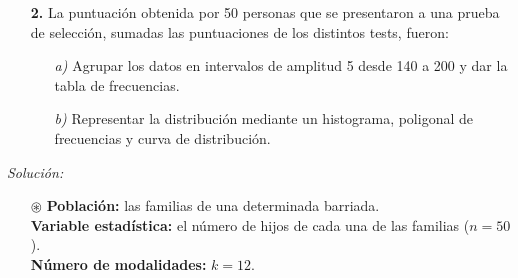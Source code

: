 \documentclass[11pt,a4paper]{article}
\theoremstyle{definition}
\begin{document}
\begin{itemize}
	\item[\textbf{2.}] La puntuación obtenida por 50 personas que se presentaron a una prueba de selección, sumadas las puntuaciones de los distintos tests, fueron:

	\begin{itemize}
		\item[\emph{a)}] Agrupar los datos en intervalos de amplitud 5 desde 140 a 200 y dar la tabla de frecuencias.
		\item[\emph{b)}] Representar la distribución mediante un histograma, poligonal de frecuencias y curva de distribución.
	\end{itemize}
\end{itemize}

{\color{grey}\hrulefill}

\emph{Solución:}

\begin{itemize}
	\item[$\circledast$] \textbf{Población:} las familias de una determinada barriada. \\ \textbf{Variable estadística:} el número de hijos de cada una de las familias ($n=50$). \\ \textbf{Número de modalidades: } $k=12$.
\end{itemize}
\end{document}
